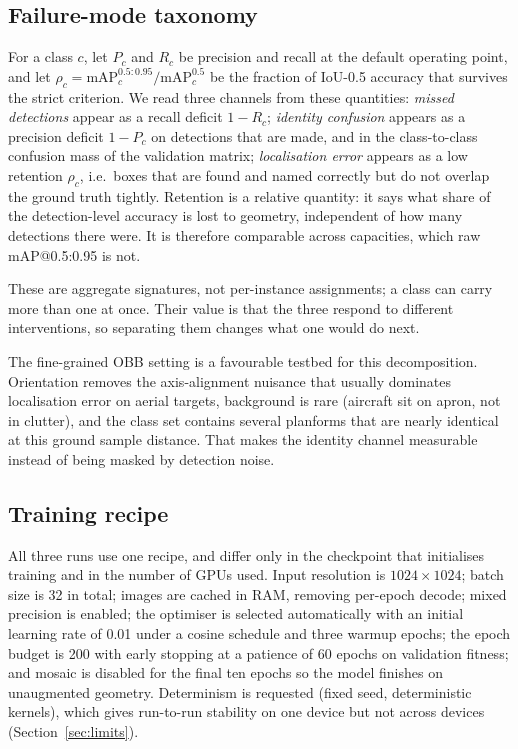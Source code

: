 \documentclass[conference]{IEEEtran}
\begin{document}
\subsection{Failure-mode taxonomy}
\label{sec:taxonomy}
For a class $c$, let $P_c$ and $R_c$ be precision and recall at the default
operating point, and let $\rho_c = \mathrm{mAP}^{0.5:0.95}_c /
\mathrm{mAP}^{0.5}_c$ be the fraction of IoU-0.5 accuracy that survives the
strict criterion. We read three channels from these quantities:
\emph{missed detections} appear as a recall deficit $1-R_c$; \emph{identity
confusion} appears as a precision deficit $1-P_c$ on detections that are made,
and in the class-to-class confusion mass of the validation matrix;
\emph{localisation error} appears as a low retention $\rho_c$, i.e.\ boxes that
are found and named correctly but do not overlap the ground truth tightly.
Retention is a relative quantity: it says what share of the detection-level
accuracy is lost to geometry, independent of how many detections there were.
It is therefore comparable across capacities, which raw mAP@0.5:0.95 is not.

These are aggregate signatures, not per-instance assignments; a class can carry
more than one at once. Their value is that the three respond to different
interventions, so separating them changes what one would do next.

The fine-grained OBB setting is a favourable testbed for this decomposition.
Orientation removes the axis-alignment nuisance that usually dominates
localisation error on aerial targets, background is rare (aircraft sit on apron,
not in clutter), and the class set contains several planforms that are nearly
identical at this ground sample distance. That makes the identity channel
measurable instead of being masked by detection noise.

\subsection{Training recipe}
All three runs use one recipe, and differ only in the checkpoint that initialises
training and in the number of GPUs used. Input resolution is
$1024\times1024$; batch size is 32 in total; images are cached in RAM, removing
per-epoch decode; mixed precision is enabled; the optimiser is selected
automatically with an initial learning rate of 0.01 under a cosine schedule and
three warmup epochs; the epoch budget is 200 with early stopping at a patience of
60 epochs on validation fitness; and mosaic is disabled for the final ten epochs
so the model finishes on unaugmented geometry. Determinism is requested (fixed
seed, deterministic kernels), which gives run-to-run stability on one device but
not across devices (Section~\ref{sec:limits}).
\end{document}
